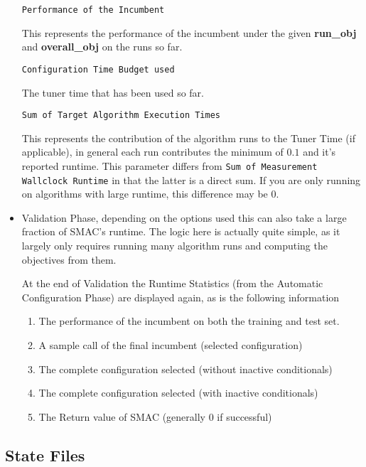 \documentclass[manual.tex]{subfiles}
\begin{document}
\begin{itemize}
\texttt{Performance of the Incumbent}

This represents the performance of the incumbent under the given \textbf{run\_obj} and \textbf{overall\_obj} on the runs so far.

\texttt{Configuration Time Budget used}

The tuner time that has been used so far.

\texttt{Sum of Target Algorithm Execution Times} 

This represents the contribution of the algorithm runs to the Tuner Time (if applicable), in general each run contributes the minimum of $0.1$ and it's reported runtime. This parameter differs from \texttt{Sum of Measurement Wallclock Runtime} in that the latter is a direct sum. If you are only running on algorithms with large runtime, this difference may be 0.

\item Validation Phase, depending on the options used this can also take a large fraction of SMAC's runtime. The logic here is actually quite simple, as it largely only requires running many algorithm runs and computing the objectives from them.

At the end of Validation the Runtime Statistics (from the Automatic Configuration Phase) are displayed again, as is the following information

\begin{enumerate}

\item The performance of the incumbent on both the training and test set.
\item A sample call of the final incumbent (selected configuration)
\item The complete configuration selected (without inactive conditionals)
\item The complete configuration selected (with inactive conditionals)
\item The Return value of SMAC (generally 0 if successful)

\end{enumerate}

\end{itemize}

\subsection{State Files}\label{subsec:state-files}
\end{document}
